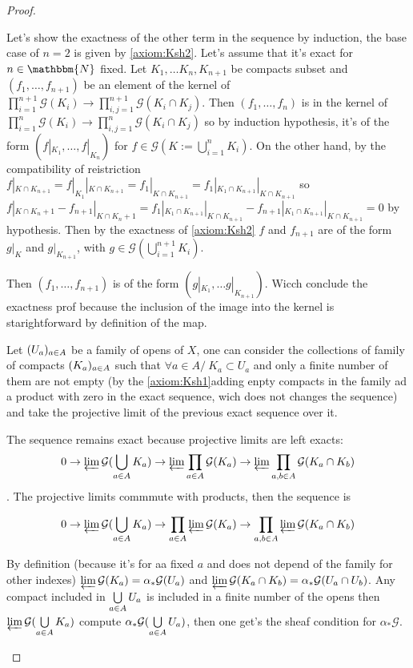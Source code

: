 \begin{proof}
\begin{itemize}
        Let's show the exactness of the other term in the sequence by induction, the base case of $n=2$ is given by \eqref{axiom:Ksh2}. Let's assume that it's exact for $n\in \mathbbm{N}$ fixed. Let $K_1,\ldots K_n, K_{n+1}$ be compacts subset and $(f_1,\ldots,f_{n+1})$ be an element of the kernel of  $\prod\limits_{i=1}^{n+1}\mathcal{G}(K_i)\to \prod\limits_{i,j=1}^{n+1}\mathcal{G}(K_i\cap K_j)$. Then $(f_1,\ldots,f_n)$ is in the kernel of $\prod\limits_{i=1}^n\mathcal{G}(K_i)\to \prod\limits_{i,j=1}^n\mathcal{G}(K_i\cap K_j)$ so by induction hypothesis, it's of the form $(f|_{K_1},\ldots,f|_{K_n})$ for $f\in \mathcal{G}(K:=\bigcup\limits_{i=1}^nK_i)$. 
        On the other hand, by the compatibility of reistriction $f|_{K\cap K_{n+1}}=f|_{K_1}|_{K\cap K_{n+1}}=f_1|_{K\cap K_{n+1}}=f_1|_{K_1\cap K_{n+1}}|_{K\cap K_{n+1}}$ so $f|_{K\cap K_n+1}-f_{n+1}|_{K\cap K_n+1}=f_1|_{K_1\cap K_{n+1}}|_{K\cap K_{n+1}}-f_{n+1}|_{K_1\cap K_{n+1}}|_{K\cap K_{n+1}}=0$ by hypothesis. Then by the exactness of \eqref{axiom:Ksh2} $f$ and $f_{n+1}$ are of the form $g|_K$ and $g|_{K_{n+1}}$, with $g\in \mathcal{G}(\bigcup\limits_{i=1}^{n+1} K_i)$.
        
        Then $(f_1,\ldots,f_{n+1})$ is of the form $(g|_{K_1},\ldots g|_{K_{n+1}})$. Wicch conclude the exactness prof because the inclusion of the image into the kernel is starightforward by definition of the map.

        Let $(U_a)_{a\in A}$ be a family of opens of $X$, one can consider the collections of family of compacts $(K_a)_{a\in A}$  such that $\forall a\in A /\ K_a\subset U_a$ and only  a finite number of them are not empty (by the \eqref{axiom:Ksh1}adding enpty compacts in the family ad a product with zero in the exact sequence, wich does not changes the sequence) and take the projective limit of the previous exact sequence over it.

        The sequence remains exact because projective limits are left exacts: $$0\to\varprojlim\mathcal{G}(\bigcup\limits_{a\in A}K_a)\to \varprojlim\prod\limits_{a\in A}\mathcal{G}(K_a)\to \varprojlim\prod\limits_{a,b\in A}\mathcal{G}(K_a\cap K_b)$$. The projective limits commmute with products, then the sequence is 

        $$0\to\varprojlim\mathcal{G}(\bigcup\limits_{a\in A}K_a)\to \prod\limits_{a\in A}\varprojlim\mathcal{G}(K_a)\to\prod\limits_{a,b\in A}\varprojlim\mathcal{G}(K_a\cap K_b)$$

        By definition (because it's for aa fixed $a$ and does not depend of the family for other indexes) $\varprojlim\mathcal{G}(K_a)=\alpha_*\mathcal{G}(U_a)$ and $\varprojlim\mathcal{G}(K_a\cap K_b)=\alpha_*\mathcal{G}(U_a\cap U_b)$. Any compact included in $\bigcup\limits_{a\in A}U_a$ is included in a finite number of the opens then $\varprojlim\mathcal{G}(\bigcup\limits_{a\in A}K_a)$ compute $\alpha_*\mathcal{G}(\bigcup\limits_{a\in A}U_a)$, then one get's the sheaf condition for $\alpha_*\mathcal{G}$.









\end{itemize}
\end{proof}
